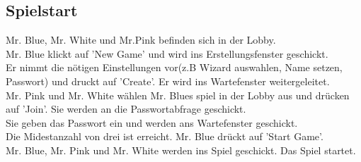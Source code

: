 \documentclass{article}
\begin{document}
	\subsection{Spielstart}
		Mr. Blue, Mr. White und Mr.Pink befinden sich in der Lobby. \\
		Mr. Blue klickt auf 'New Game' und wird ins Erstellungsfenster geschickt. \\
		Er nimmt die nötigen Einstellungen vor(z.B Wizard auswahlen, Name setzen, Passwort) und druckt auf 'Create'. Er wird ins  Wartefenster weitergeleitet.\\
		Mr. Pink und Mr. White wählen Mr. Blues spiel in der Lobby aus und drücken auf 'Join'. Sie werden an die Passwortabfrage geschickt.\\
		Sie geben das Passwort ein und werden ans Wartefenster geschickt.\\
		Die Midestanzahl von drei ist erreicht. Mr. Blue drückt auf 'Start Game'.\\
		Mr. Blue, Mr. Pink und Mr. White werden ins Spiel geschickt. Das Spiel startet.\\
\end{document}
